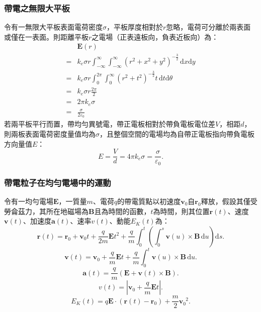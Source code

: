 \documentclass[a4paper,12pt]{report}
\begin{document}
\begin{itemize}
\subsubsection{帶電之無限大平板}
令有一無限大平板表面電荷密度$\sigma$，平板厚度相對於$r$忽略，電荷可分離於兩表面或僅在一表面。則距離平板$r$之電場（正表遠板向，負表近板向）為：
\[\begin{aligned}
& \mathbf{E}(r)\\
=& k_e\sigma r\int_{-\infty}^\infty\int_{-\infty}^\infty\left(r^2+x^2+y^2\right)^{-\frac{3}{2}}\,\mathrm{d}x\mathrm{d}y\\
=& k_e\sigma r\int_0^{2\pi}\int_0^\infty\left(r^2+t^2\right)^{-\frac{3}{2}}t\,\mathrm{d}t\mathrm{d}\theta\\
=& k_e\sigma r\frac{2\pi}{2}\\
=& 2\pi k_e\sigma\\
=& \frac{\sigma}{2\varepsilon_0}
\end{aligned}\]
若兩平板平行而置，帶均勻異號電，帶正電板相對於帶負電板電位差$V$，相距$d$，則兩板表面電荷密度量值均為$\sigma$，且整個空間的電場均為自帶正電板指向帶負電板方向量值$E$：
\[E=\frac{V}{d}=4\pi k_e\sigma=\frac{\sigma}{\varepsilon_0}.\]
\subsubsection{帶電粒子在均勻電場中的運動}
令有一均勻電場$\mathbf{E}$，一質量$m$、電荷$q$的帶電質點以初速度$\mathbf{v}_0$自$\mathbf{r}_0$釋放，假設其僅受勞侖茲力，其所在地磁場為$\mathbf{B}$且為時間的函數，$t$為時間，則其位置$\mathbf{r}(t)$、速度$\mathbf{v}(t)$、加速度$\mathbf{a}(t)$、速率$v(t)$、動能$E_K(t)$為：
\[\mathbf{r}(t)=\mathbf{r}_0+\mathbf{v}_0t+\frac{q}{2m}\mathbf{E}t^2+\frac{q}{m}\int_0^t\left(\int_0^s\mathbf{v}(u)\times\mathbf{B}\,\mathrm{d}u\right)\mathrm{d}s.\]
\[\mathbf{v}(t)=\mathbf{v}_0+\frac{q}{m}\mathbf{E}t+\frac{q}{m}\int_0^t\mathbf{v}(u)\times\mathbf{B}\,\mathrm{d}u.\]
\[\mathbf{a}(t)=\frac{q}{m}(\mathbf{E}+\mathbf{v}(t)\times\mathbf{B}).\]
\[v(t)=|\mathbf{v}_0+\frac{q}{m}\mathbf{E}t|.\]
\[E_K(t)=q\mathbf{E}\cdot(\mathbf{r}(t)-\mathbf{r}_0)+\frac{m}{2}\mathbf{v}_0^{\phantom{0}2}.\]

\end{itemize}
\end{document}
